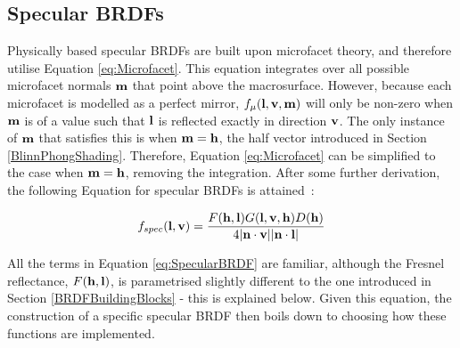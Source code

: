 \subsection{Specular BRDFs} \label{SpecularBRDFs}

Physically based specular BRDFs are built upon microfacet theory, and therefore utilise Equation \ref{eq:Microfacet}. This equation integrates over all possible microfacet normals \begin{math}\mathbf{m}\end{math} that point above the macrosurface. However, because each microfacet is modelled as a perfect mirror, \begin{math}f_\mu(\mathbf{l}, \mathbf{v}, \mathbf{m})\end{math} will only be non-zero when \begin{math}\mathbf{m}\end{math} is of a value such that \begin{math}\mathbf{l}\end{math} is reflected exactly in direction \begin{math}\mathbf{v}\end{math}. The only instance of \begin{math}\mathbf{m}\end{math} that satisfies this is when \begin{math}\mathbf{m} = \mathbf{h}\end{math}, the half vector introduced in Section \ref{BlinnPhongShading}. Therefore, Equation \ref{eq:Microfacet} can be simplified to the case when \begin{math}\mathbf{m} = \mathbf{h}\end{math}, removing the integration. After some further derivation, the following Equation for specular BRDFs is attained~\cite{HeitzMicrofacetTheory}:

\begin{equation} \label{eq:SpecularBRDF}
	f_{spec}(\mathbf{l}, \mathbf{v}) = \frac{F(\mathbf{h}, \mathbf{l})G(\mathbf{l}, \mathbf{v}, \mathbf{h})D(\mathbf{h})}{4\abs{\mathbf{n}\cdot\mathbf{v}}\abs{\mathbf{n}\cdot\mathbf{l}}}
\end{equation}

All the terms in Equation \ref{eq:SpecularBRDF} are familiar, although the Fresnel reflectance, \begin{math}F(\mathbf{h}, \mathbf{l})\end{math}, is parametrised slightly different to the one introduced in Section \ref{BRDFBuildingBlocks} - this is explained below. Given this equation, the construction of a specific specular BRDF then boils down to choosing how these functions are implemented.

